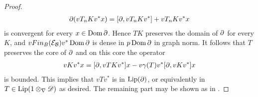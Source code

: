 \begin{proof}
\begin{align*}
		\partial(vT_nKv^*x)=[\partial,vT_nKv^*]+vT_nKv^*x 
	\end{align*}
	is convergent for every $x\in \operatorname{Dom} \partial$. Hence $TK$ preserves the domain of $\partial$ for every $K$, and $vFin_B(\mathcal{E}_{\mathcal{B}})v^*\operatorname{Dom} \partial$ is dense in $p\operatorname{Dom} \partial$ in graph norm. It follows that $T$ preserves the core of $\partial$ and on this core the operator
	\begin{align*}
		[\part,vTv^*]vKv^*x=[\part, vTKv^*]x-v\gamma(T)v^*[\part,vKv^*]x
	\end{align*}
	is bounded. This implies that $vTv^*$ is in $\operatorname{Lip}(\partial)$, or equivalently in $T\in \operatorname{Lip}(1\otimes_\nabla \mathscr{D})$ as desired. The remaining part may be shown as in .
\end{proof}
